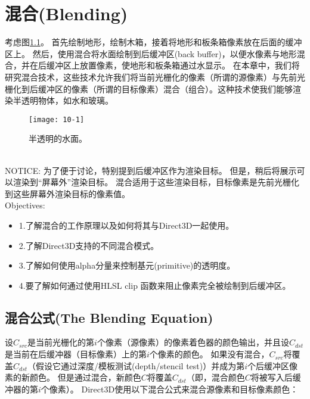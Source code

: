 \chapter{混合(Blending)}
\begin{flushleft}
考虑图\ref{fig:10-1}。 首先绘制地形，绘制木箱，接着将地形和板条箱像素放在后面的缓冲区上。 然后，使用混合将水面绘制到后缓冲区(back buffer)，以便水像素与地形混合，并在后缓冲区上放置像素，使地形和板条箱通过水显示。 在本章中，我们将研究混合技术，这些技术允许我们将当前光栅化的像素（所谓的源像素）与先前光栅化到后缓冲区的像素（所谓的目标像素）混合（组合）。这种技术使我们能够渲染半透明物体，如水和玻璃。\\
\end{flushleft}

\begin{figure}[h]
    \texttt{[image: 10-1]}
    \centering
    \caption{半透明的水面。}
    \label{fig:10-1}
\end{figure}

\begin{flushleft}
~\\
NOTICE: 为了便于讨论，特别提到后缓冲区作为渲染目标。 但是，稍后将展示可以渲染到“屏幕外”渲染目标。 混合适用于这些渲染目标，目标像素是先前光栅化到这些屏幕外渲染目标的像素值。
~\\
{\large Objectives:}
\begin{itemize}
    \item 1.了解混合的工作原理以及如何将其与Direct3D一起使用。
    \item 2.了解Direct3D支持的不同混合模式。
    \item 3.了解如何使用alpha分量来控制基元(primitive)的透明度。
    \item 4.要了解如何通过使用HLSL clip 函数来阻止像素完全被绘制到后缓冲区。
\end{itemize}
\end{flushleft}

\section{混合公式(The Blending Equation)}
\begin{flushleft}
设$C_{src}$是当前光栅化的第$i$个像素（源像素）的像素着色器的颜色输出，并且设$C_{dst}$是当前在后缓冲器（目标像素）上的第$i$个像素的颜色。 如果没有混合，$C_{src}$将覆盖$C_{dst}$（假设它通过深度/模板测试(depth/stencil test)）并成为第$i$个后缓冲区像素的新颜色。 但是通过混合，新颜色$C$将覆盖$C_{dst}$（即，混合颜色$C$将被写入后缓冲器的第$i$个像素）。 Direct3D使用以下混合公式来混合源像素和目标像素颜色：\\
\end{flushleft}

